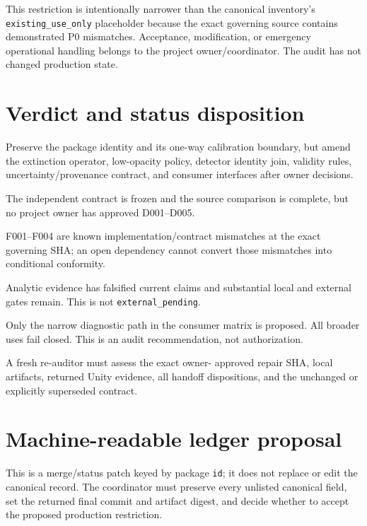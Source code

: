 \documentclass[11pt]{article}
\newcommand{\code}[1]{\nolinkurl{#1}}
\begin{document}
This restriction is intentionally narrower than the canonical inventory's
\code{existing_use_only} placeholder because the exact governing source
contains demonstrated P0 mismatches.  Acceptance, modification, or emergency
operational handling belongs to the project owner/coordinator.  The audit has
not changed production state.

\section{Verdict and status disposition}

\begin{description}[style=nextline]
\item[Verdict: \code{amend}] Preserve the package identity and its one-way
calibration boundary, but amend the extinction operator, low-opacity policy,
detector identity join, validity rules, uncertainty/provenance contract, and
consumer interfaces after owner decisions.
\item[Contract: \code{proposed}] The independent contract is frozen and the
source comparison is complete, but no project owner has approved D001--D005.
\item[Implementation: \code{nonconformant}] F001--F004 are known
implementation/contract mismatches at the exact governing SHA; an open
dependency cannot convert those mismatches into conditional conformity.
\item[Validation: \code{in_progress}] Analytic evidence has falsified current
claims and substantial local and external gates remain.  This is not
\code{external_pending}.
\item[Production: proposed \code{restricted_use}] Only the narrow diagnostic
path in the consumer matrix is proposed.  All broader uses fail closed.  This
is an audit recommendation, not authorization.
\item[Re-audit: \code{required}] A fresh re-auditor must assess the exact owner-
approved repair SHA, local artifacts, returned Unity evidence, all handoff
dispositions, and the unchanged or explicitly superseded contract.
\end{description}

\section{Machine-readable ledger proposal}

This is a merge/status patch keyed by package \code{id}; it does not replace
or edit the canonical record.  The coordinator must preserve every unlisted
canonical field, set the returned final commit and artifact digest, and decide
whether to accept the proposed production restriction.
\end{document}

